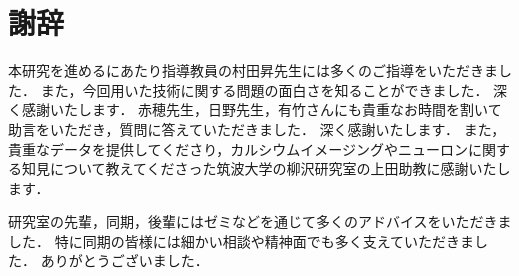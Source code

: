 \chapter*{謝辞}
本研究を進めるにあたり指導教員の村田昇先生には多くのご指導をいただきました．
また，今回用いた技術に関する問題の面白さを知ることができました．
深く感謝いたします．
赤穂先生，日野先生，有竹さんにも貴重なお時間を割いて助言をいただき，質問に答えていただきました．
深く感謝いたします．
また，貴重なデータを提供してくださり，カルシウムイメージングやニューロンに関する知見について教えてくださった筑波大学の柳沢研究室の上田助教に感謝いたします．

研究室の先輩，同期，後輩にはゼミなどを通じて多くのアドバイスをいただきました．
特に同期の皆様には細かい相談や精神面でも多く支えていただきました．
ありがとうございました．

